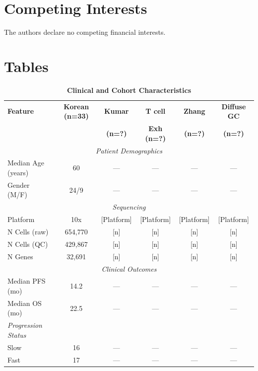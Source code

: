 \documentclass[12pt,twoside]{article}
\begin{document}
\section*{Competing Interests}

The authors declare no competing financial interests.






\newpage
\section*{Tables}

\begin{table}[H]
\centering
\caption{\textbf{Clinical and Cohort Characteristics}}
\label{table:1}
\small
\begin{tabular}{l | c c c c c}
\toprule
\textbf{Feature} & \textbf{Korean (n=33)} & \textbf{Kumar} & \textbf{T cell} & \textbf{Zhang} & \textbf{Diffuse GC} \\
& & \textbf{(n=?)} & \textbf{Exh (n=?)} & \textbf{(n=?)} & \textbf{(n=?)} \\
\midrule
\multicolumn{6}{c}{\textit{Patient Demographics}} \\
Median Age (years) & 60 & — & — & — & — \\
Gender (M/F) & 24/9 & — & — & — & — \\
\midrule
\multicolumn{6}{c}{\textit{Sequencing}} \\
Platform & 10x & [Platform] & [Platform] & [Platform] & [Platform] \\
N Cells (raw) & 654,770 & [n] & [n] & [n] & [n] \\
N Cells (QC) & 429,867 & [n] & [n] & [n] & [n] \\
N Genes & 32,691 & [n] & [n] & [n] & [n] \\
\midrule
\multicolumn{6}{c}{\textit{Clinical Outcomes}} \\
Median PFS (mo) & 14.2 & — & — & — & — \\
Median OS (mo) & 22.5 & — & — & — & — \\
\midrule
\textit{Progression Status} \\
Slow & 16 & — & — & — & — \\
Fast & 17 & — & — & — & — \\
\bottomrule
\end{tabular}
\end{table}
\end{document}
